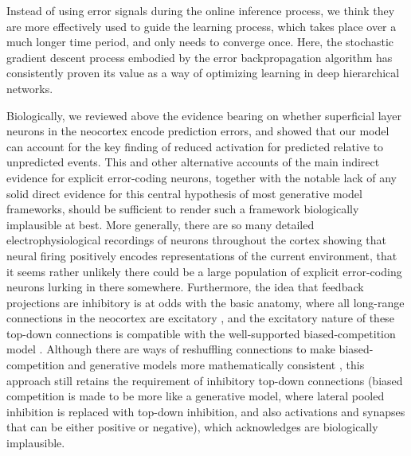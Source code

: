 \documentclass[11pt,twoside]{article}
\newif\myifpdf
\begin{document}
Instead of using error signals during the online inference process, we think they are more effectively used to guide the learning process, which takes place over a much longer time period, and only needs to converge once.  Here, the stochastic gradient descent process embodied by the error backpropagation algorithm has consistently proven its value as a way of optimizing learning in deep hierarchical networks.  

Biologically, we reviewed above the evidence bearing on whether superficial layer neurons in the neocortex encode prediction errors, and showed that our model can account for the key finding of reduced activation for predicted relative to unpredicted events.  This and other alternative accounts of the main indirect evidence for explicit error-coding neurons, together with the notable lack of any solid direct evidence for this central hypothesis of most generative model frameworks, should be sufficient to render such a framework biologically implausible at best.  More generally, there are so many detailed electrophysiological recordings of neurons throughout the cortex showing that neural firing positively encodes representations of the current environment, that it seems rather unlikely there could be a large population of explicit error-coding neurons lurking in there somewhere.  Furthermore, the idea that feedback projections are inhibitory is at odds with the basic anatomy, where all long-range connections in the neocortex are excitatory \cite{JohnsonBurkhalter97,ShaoBurkhalter96}, and the excitatory nature of these top-down connections is compatible with the well-supported biased-competition model \cite{DesimoneDuncan95,MillerCohen01}.  Although there are ways of reshuffling connections to make biased-competition and generative models more mathematically consistent \cite{Spratling08}, this approach still retains the requirement of inhibitory top-down connections (biased competition is made to be more like a generative model, where lateral pooled inhibition is replaced with top-down inhibition, and also activations and synapses that can be either positive or negative), which  acknowledges are biologically implausible.

\end{document}
